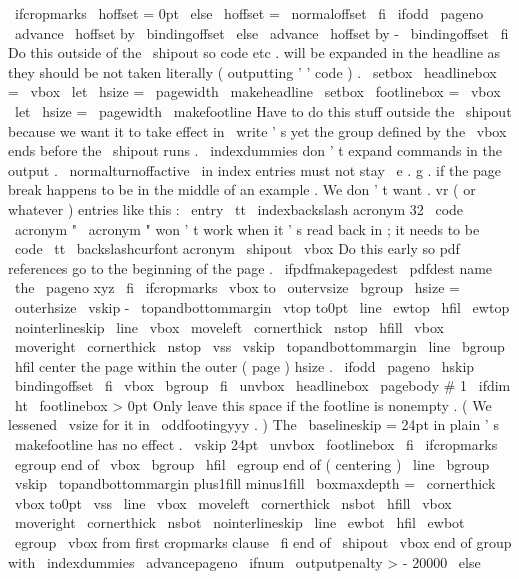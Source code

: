{
%
\
ifcropmarks
\
hoffset
=
0pt
\
else
\
hoffset
=
\
normaloffset
\
fi
%
\
ifodd
\
pageno
\
advance
\
hoffset
by
\
bindingoffset
\
else
\
advance
\
hoffset
by
-
\
bindingoffset
\
fi
%
%
Do
this
outside
of
the
\
shipout
so
code
etc
.
will
be
expanded
in
%
the
headline
as
they
should
be
not
taken
literally
(
outputting
'
'
code
)
.
\
setbox
\
headlinebox
=
\
vbox
{
\
let
\
hsize
=
\
pagewidth
\
makeheadline
}
%
\
setbox
\
footlinebox
=
\
vbox
{
\
let
\
hsize
=
\
pagewidth
\
makefootline
}
%
%
{
%
%
Have
to
do
this
stuff
outside
the
\
shipout
because
we
want
it
to
%
take
effect
in
\
write
'
s
yet
the
group
defined
by
the
\
vbox
ends
%
before
the
\
shipout
runs
.
%
\
indexdummies
%
don
'
t
expand
commands
in
the
output
.
\
normalturnoffactive
%
\
in
index
entries
must
not
stay
\
e
.
g
.
if
%
the
page
break
happens
to
be
in
the
middle
of
an
example
.
%
We
don
'
t
want
.
vr
(
or
whatever
)
entries
like
this
:
%
\
entry
{
{
\
tt
\
indexbackslash
}
acronym
}
{
32
}
{
\
code
{
\
acronym
}
}
%
"
\
acronym
"
won
'
t
work
when
it
'
s
read
back
in
;
%
it
needs
to
be
%
{
\
code
{
{
\
tt
\
backslashcurfont
}
acronym
}
\
shipout
\
vbox
{
%
%
Do
this
early
so
pdf
references
go
to
the
beginning
of
the
page
.
\
ifpdfmakepagedest
\
pdfdest
name
{
\
the
\
pageno
}
xyz
\
fi
%
\
ifcropmarks
\
vbox
to
\
outervsize
\
bgroup
\
hsize
=
\
outerhsize
\
vskip
-
\
topandbottommargin
\
vtop
to0pt
{
%
\
line
{
\
ewtop
\
hfil
\
ewtop
}
%
\
nointerlineskip
\
line
{
%
\
vbox
{
\
moveleft
\
cornerthick
\
nstop
}
%
\
hfill
\
vbox
{
\
moveright
\
cornerthick
\
nstop
}
%
}
%
\
vss
}
%
\
vskip
\
topandbottommargin
\
line
\
bgroup
\
hfil
%
center
the
page
within
the
outer
(
page
)
hsize
.
\
ifodd
\
pageno
\
hskip
\
bindingoffset
\
fi
\
vbox
\
bgroup
\
fi
%
\
unvbox
\
headlinebox
\
pagebody
{
#
1
}
%
\
ifdim
\
ht
\
footlinebox
>
0pt
%
Only
leave
this
space
if
the
footline
is
nonempty
.
%
(
We
lessened
\
vsize
for
it
in
\
oddfootingyyy
.
)
%
The
\
baselineskip
=
24pt
in
plain
'
s
\
makefootline
has
no
effect
.
\
vskip
24pt
\
unvbox
\
footlinebox
\
fi
%
\
ifcropmarks
\
egroup
%
end
of
\
vbox
\
bgroup
\
hfil
\
egroup
%
end
of
(
centering
)
\
line
\
bgroup
\
vskip
\
topandbottommargin
plus1fill
minus1fill
\
boxmaxdepth
=
\
cornerthick
\
vbox
to0pt
{
\
vss
\
line
{
%
\
vbox
{
\
moveleft
\
cornerthick
\
nsbot
}
%
\
hfill
\
vbox
{
\
moveright
\
cornerthick
\
nsbot
}
%
}
%
\
nointerlineskip
\
line
{
\
ewbot
\
hfil
\
ewbot
}
%
}
%
\
egroup
%
\
vbox
from
first
cropmarks
clause
\
fi
}
%
end
of
\
shipout
\
vbox
}
%
end
of
group
with
\
indexdummies
\
advancepageno
\
ifnum
\
outputpenalty
>
-
20000
\
else
\
}}
